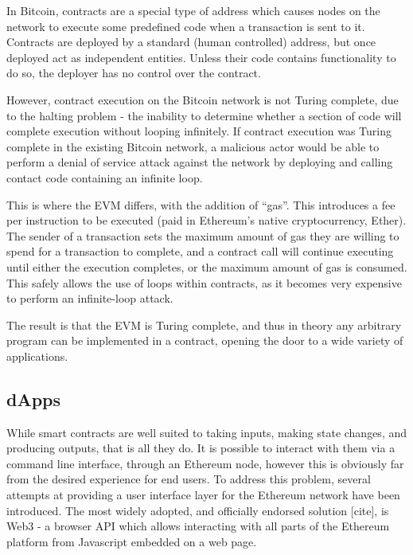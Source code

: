 In Bitcoin, contracts are a special type of address which causes nodes on the network to execute some predefined code when a transaction is sent to it. Contracts are deployed by a standard (human controlled) address, but once deployed act as independent entities. Unless their code contains functionality to do so, the deployer has no control over the contract.

However, contract execution on the Bitcoin network is not Turing complete, due to the halting problem - the inability to determine whether a section of code will complete execution without looping infinitely. If contract execution was Turing complete in the existing Bitcoin network, a malicious actor would be able to perform a denial of service attack against the network by deploying and calling contact code containing an infinite loop.

This is where the EVM differs, with the addition of “gas”. This introduces a fee per instruction to be executed (paid in Ethereum’s native cryptocurrency, Ether). The sender of a transaction sets the maximum amount of gas they are willing to spend for a transaction to complete, and a contract call will continue executing until either the execution completes, or the maximum amount of gas is consumed. This safely allows the use of loops within contracts, as it becomes very expensive to perform an infinite-loop attack.

The result is that the EVM is Turing complete, and thus in theory any arbitrary program can be implemented in a contract, opening the door to a wide variety of applications.

\subsection{dApps}

While smart contracts are well suited to taking inputs, making state changes, and producing outputs, that is all they do. It is possible to interact with them via a command line interface, through an Ethereum node, however this is obviously far from the desired experience for end users. To address this problem, several attempts at providing a user interface layer for the Ethereum network have been introduced. The most widely adopted, and officially endorsed solution [cite], is Web3 - a browser API which allows interacting with all parts of the Ethereum platform from Javascript embedded on a web page.


